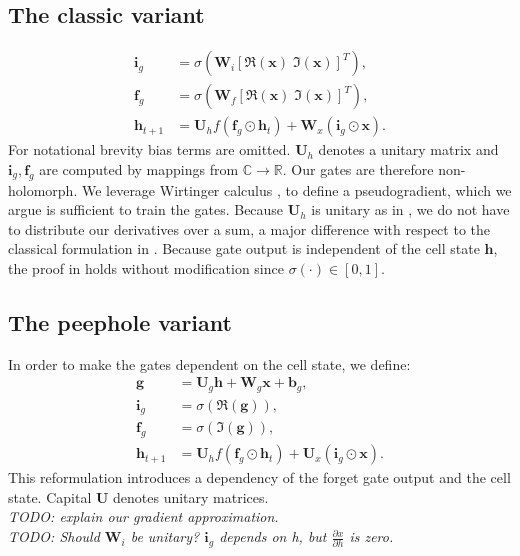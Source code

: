\documentclass{article}
\begin{document}
\subsection{The classic variant}
\begin{align}
\mathbf{i}_g &= \sigma(\mathbf{W}_i[\Re(\mathbf{x}) \; \Im(\mathbf{x})]^T),  \\
\mathbf{f}_g &= \sigma(\mathbf{W}_f[\Re(\mathbf{x}) \; \Im(\mathbf{x})]^T),  \\
\mathbf{h}_{t+1} &= \mathbf{U}_h f(\mathbf{f}_g \odot \mathbf{h}_t) + \mathbf{W}_x(\mathbf{i}_g \odot \mathbf{x}).
\end{align}
For notational brevity bias terms are omitted. $\mathbf{U}_h$ denotes a unitary matrix and $\mathbf{i}_g, \mathbf{f}_g$ are computed by mappings from $\mathbb{C} \rightarrow \mathbb{R}$. Our gates are therefore non-holomorph. We leverage Wirtinger calculus \cite{Franken}\cite{Delgado}\cite{Wirtinger}, to define a pseudogradient, which we argue is sufficient to train the gates. Because $\mathbf{U}_h$ is unitary as in \cite{Arjovsky}, we do not have to distribute our derivatives over a sum, a major difference with respect to the classical formulation in \cite{Hochreiter}. Because gate output is independent of the cell state $\mathbf{h}$, the proof in \cite{Arjovsky} holds without modification since $\sigma(\cdot) \in [0, 1]$.

\subsection{The peephole variant}
In order to make the gates dependent on the cell state, we define:
\begin{align}
\mathbf{g} &= \mathbf{U}_g \mathbf{h} + \mathbf{W}_g\mathbf{x} + \mathbf{b}_g, \\
\mathbf{i}_g &= \sigma(\Re(\mathbf{g})), \\
\mathbf{f}_g &= \sigma(\Im(\mathbf{g})), \\
\mathbf{h}_{t+1} &= \mathbf{U}_h f(\mathbf{f}_g \odot \mathbf{h}_t) + \mathbf{U}_x(\mathbf{i}_g \odot \mathbf{x}).
\end{align}
This reformulation introduces a dependency of the forget gate output and the cell state. Capital $\mathbf{U}$ denotes unitary matrices. \\
\textit{TODO: explain our gradient approximation.} \\
\textit{TODO: Should $\mathbf{W}_i$ be unitary? $\mathbf{i}_g$ depends on h, but $\frac{\partial x}{\partial h}$ is zero.}
\end{document}
